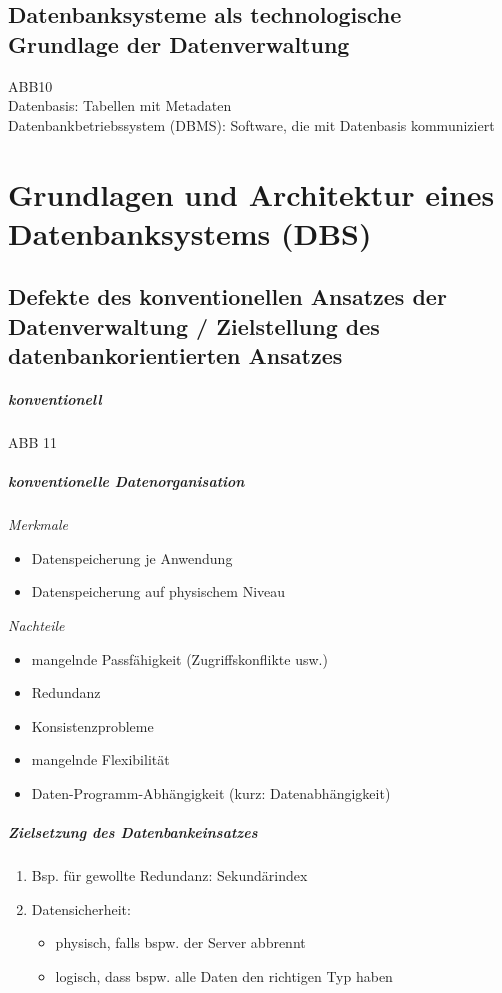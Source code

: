 \section[Datenbanksysteme als Grundlage]{Datenbanksysteme als technologische Grundlage der Datenverwaltung}
ABB10\\
Datenbasis: Tabellen mit Metadaten\\
Datenbankbetriebssystem (DBMS): Software, die mit Datenbasis kommuniziert

\chapter[Datenbanksystem]{Grundlagen und Architektur eines Datenbanksystems (DBS)}

\section[Konventioneller / Datenbankorientierter Ansatz]{Defekte des konventionellen Ansatzes der Datenverwaltung / Zielstellung des datenbankorientierten Ansatzes}
\paragraph{konventionell} \parskp
ABB 11
\paragraph{konventionelle Datenorganisation}\parskp
\emph{Merkmale}
\begin{itemize}
\item Datenspeicherung je Anwendung
\item Datenspeicherung auf physischem Niveau
\end{itemize}
\emph{Nachteile}
\begin{itemize}
\item mangelnde Passfähigkeit (Zugriffskonflikte usw.)
\item Redundanz
\item Konsistenzprobleme
\item mangelnde Flexibilität
\item Daten-Programm-Abhängigkeit (kurz: Datenabhängigkeit)
\end{itemize}
\paragraph{Zielsetzung des Datenbankeinsatzes}
\begin{enumerate}
\item Bsp. für gewollte Redundanz: Sekundärindex
\item Datensicherheit:
\begin{itemize}
\item physisch, falls bspw. der Server abbrennt
\item logisch, dass bspw. alle Daten den richtigen Typ haben
\end{itemize}
\end{enumerate}

